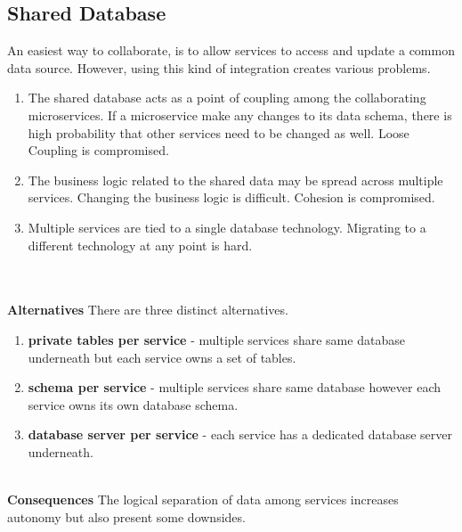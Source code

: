 \subsection{Shared Database}\label{section:challanges_of_microservices_architecture/integration/shared_database}
An easiest way to collaborate, is to allow services to access and update a common data source. However, using this kind of integration creates various problems.\cite{Newman:2015aa}
\begin{enumerate}
\item The shared database acts as a point of coupling among the collaborating microservices. If a microservice make any changes to its data schema, there is high probability that other services need to be changed as well. Loose Coupling is compromised.
\item The business logic related to the shared data may be spread across multiple services. Changing the business logic is difficult. Cohesion is compromised.
\item Multiple services are tied to a single database technology. Migrating to a different technology at any point is hard.
\end{enumerate}
\\
\\
\textbf{Alternatives}\label{section:challanges_of_microservices_architecture/integration/alternatives}
There are three distinct alternatives.\cite{Richardson:2015aa}
\begin{enumerate}
\item \textbf{private tables per service} - multiple services share same database underneath but each service owns a set of tables.
\item \textbf{schema per service} - multiple services share same database however each service owns its own database schema.
\item \textbf{database server per service} - each service has a dedicated database server underneath.
\end{enumerate}
\\
\textbf{Consequences}\label{section:challanges_of_microservices_architecture/integration/consequences}
The logical separation of data among services increases autonomy but also present some downsides.\cite{Richardson:2016aa} \cite{Richardson:2015aa}
